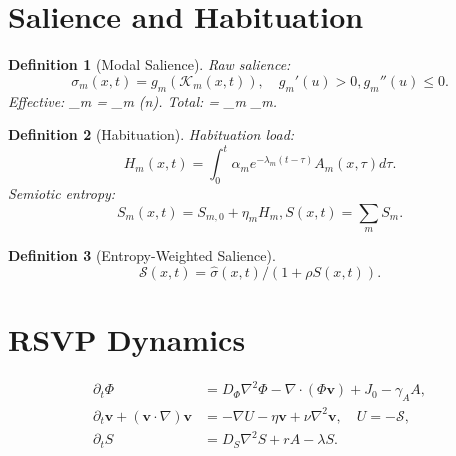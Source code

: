 \documentclass[openany]{book}
\newtheorem{definition}{Definition}[chapter]
\begin{document}
\section{Salience and Habituation}
\label{sec:rsvp-salience}

\begin{definition}[Modal Salience]
Raw salience:
\begin{equation}
\label{eq:raw-salience}
\sigma_m(x,t) = g_m(\mathcal{K}_m(x,t)), \quad g_m'(u)>0, g_m''(u)\leq 0.
\end{equation}
Effective: \widehat{\sigma}_m = \sigma_m \chi(n). Total: \widehat{\sigma} = \sum_m \widehat{\sigma}_m.
\end{definition}

\begin{definition}[Habituation]
Habituation load:
\begin{equation}
\label{eq:habituation}
H_m(x,t) = \int_0^t \alpha_m e^{-\lambda_m (t-\tau)} A_m(x,\tau) d\tau.
\end{equation}
Semiotic entropy:
\begin{equation}
\label{eq:semiotic-entropy}
S_m(x,t) = S_{m,0} + \eta_m H_m, S(x,t) = \sum_m S_m.
\end{equation}
\end{definition}

\begin{definition}[Entropy-Weighted Salience]
\begin{equation}
\label{eq:entropy-suppress}
\mathcal{S}(x,t) = \widehat{\sigma}(x,t) / (1 + \rho S(x,t)).
\end{equation}
\end{definition}

\section{RSVP Dynamics}
\label{sec:rsvp-dynamics}
\begin{align}
\partial_t \Phi &= D_\Phi \nabla^2 \Phi - \nabla \cdot (\Phi \mathbf{v}) + J_0 - \gamma_A A, \label{eq:phi} \\
\partial_t \mathbf{v} + (\mathbf{v} \cdot \nabla)\mathbf{v} &= -\nabla U - \eta \mathbf{v} + \nu \nabla^2 \mathbf{v}, \quad U = -\mathcal{S}, \label{eq:v} \\
\partial_t S &= D_S \nabla^2 S + r A - \lambda S. \label{eq:S}
\end{align}
\end{document}
